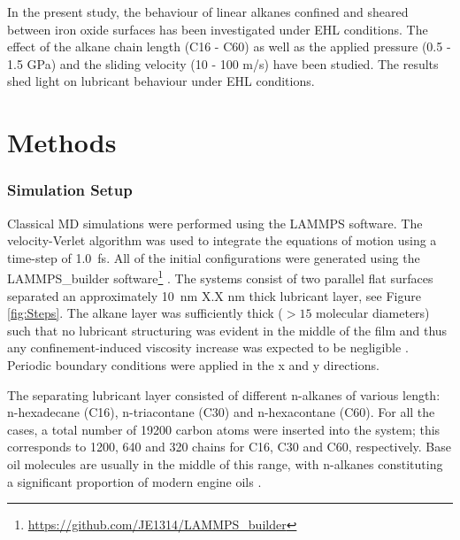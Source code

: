 \documentclass[aps,prb,reprint,superscriptaddress, a4paper]{revtex4-1}
\begin{document}
In the present study, the behaviour of linear alkanes confined and sheared between iron oxide surfaces has been investigated under EHL conditions. The effect of the alkane chain length (C16 - C60) as well as the applied pressure (0.5 - 1.5 GPa) and the sliding velocity (10 - 100 m/s) have been studied. The results shed light on lubricant behaviour under EHL conditions.

\section{Methods}

\subsubsection{Simulation Setup}

Classical MD simulations were performed using the LAMMPS \cite{Plimpton1995} software. The velocity-Verlet algorithm was used to integrate the equations of motion using a  time-step of \SI{1.0}{\femto\second}. All of the initial configurations were generated using the LAMMPS\_builder software\footnote{\url{https://github.com/JE1314/LAMMPS_builder}} \cite{Ewen2017b,Jewett2013,HjorthLarsen2017}. The systems consist of two parallel flat surfaces separated an approximately \SI{10}{\nano\meter} X.X nm thick lubricant layer, see Figure \ref{fig:Steps}. The alkane layer was sufficiently thick ($>15$ molecular diameters) such that no lubricant structuring was evident in the middle of the film and thus any confinement-induced viscosity increase was expected to be negligible \cite{Gee1990}. Periodic boundary conditions were applied in the x and y directions.

The separating lubricant layer consisted of different n-alkanes of various length: n-hexadecane (C16), n-triacontane (C30) and n-hexacontane (C60). For all the cases, a  total number of 19200 carbon atoms were inserted into the system; this corresponds to 1200, 640 and 320 chains for C16, C30 and C60, respectively. Base oil molecules are usually in the middle of this range, with n-alkanes constituting a significant proportion of modern engine oils \cite{Liang2018}.
\end{document}
